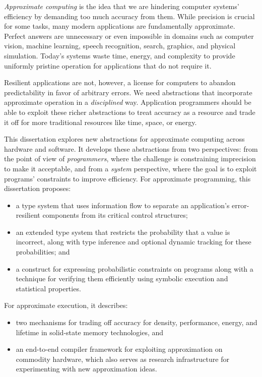\emph{Approximate computing} is the idea that we are hindering computer
systems' efficiency by demanding too much accuracy from them.
While precision is crucial for some tasks, many
modern applications are fundamentally approximate.
Perfect answers are unnecessary or even impossible in domains such as
computer vision, machine learning,
speech recognition, search, graphics, and physical simulation.
Today's systems waste time, energy, and complexity to provide uniformly
pristine operation for applications that do not require it.

Resilient applications are not, however, a license for computers to abandon
predictability in favor of arbitrary errors.
We need abstractions that incorporate approximate operation in a
\emph{disciplined} way.
Application programmers should be able to exploit these richer abstractions to
treat accuracy as a resource and trade it off for more traditional
resources like time, space, or energy.

This dissertation explores new abstractions for approximate computing across
hardware and software.
It develops these abstractions from two perspectives:
from the point of view of \emph{programmers}, where the challenge is
constraining imprecision to make it acceptable,
and from a \emph{system} perspective, where the goal is to exploit programs'
constraints to improve efficiency.
For approximate programming, this dissertation proposes:
%
\begin{itemize}
\item
a type system that uses information flow to separate an
application's error-resilient components from its critical control structures;
\item
an extended type system that restricts the probability that a value
is incorrect, along with type inference and optional dynamic tracking for
these probabilities; and
\item
a construct for expressing probabilistic constraints on programs along with a
technique for verifying them efficiently using symbolic execution and
statistical properties.
\end{itemize}
%
For approximate execution, it describes:
%
\begin{itemize}
\item
two mechanisms for trading off accuracy for density, performance, energy, and
lifetime in solid-state memory technologies, and
\item
an end-to-end compiler framework for exploiting approximation on
commodity hardware, which also serves as research infrastructure for
experimenting with new approximation ideas.
\end{itemize}
